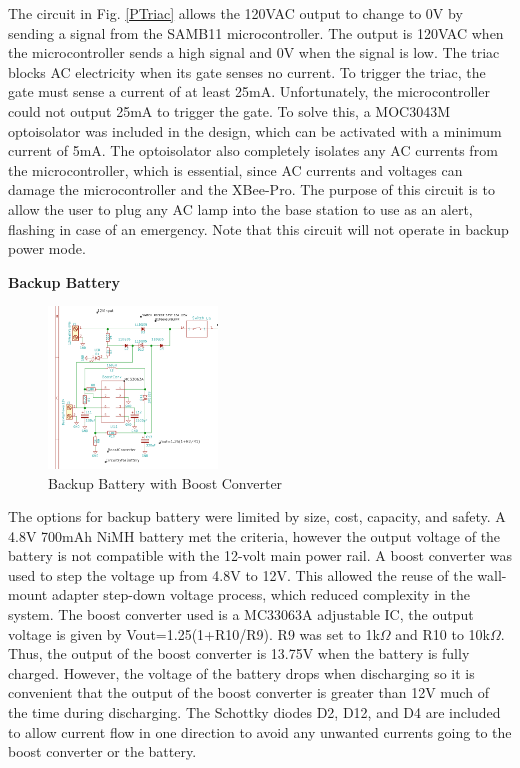 \documentclass[journal,compsoc]{IEEEtran}
\begin{document}
The circuit in Fig. \ref{PTriac} allows the 120VAC output to change to 0V by sending a signal from the SAMB11 microcontroller.  The output is 120VAC when the microcontroller sends a high signal and 0V when the signal is low.  The triac blocks AC electricity when its gate senses no current.  To trigger the triac, the gate must sense a current of at least 25mA.  Unfortunately, the microcontroller could not output 25mA to trigger the gate.  To solve this, a MOC3043M optoisolator was included in the design, which can be activated with a minimum current of 5mA.  The optoisolator also completely isolates any AC currents from the microcontroller, which is essential, since AC currents and voltages can damage the microcontroller and the XBee-Pro.  The purpose of this circuit is to allow the user to plug any AC lamp into the base station to use as an alert, flashing in case of an emergency.  Note that this circuit will not operate in backup power mode.


\textbf {Backup Battery}

\begin{figure}[ht]	%
\centering
\includegraphics[width=0.4\textwidth]{Boost.png}
\caption{Backup Battery with Boost Converter}
\label{Pboost}
\end{figure}

The options for backup battery were limited by size, cost, capacity, and safety.  A 4.8V 700mAh NiMH battery met the criteria, however the output voltage of the battery is not compatible with the 12-volt main power rail.  A boost converter was used to step the voltage up from 4.8V to 12V.  This allowed the reuse of the wall-mount adapter step-down voltage process, which reduced complexity in the system.  The boost converter used is a MC33063A adjustable IC, the output voltage is given by Vout=1.25(1+R10/R9).  R9 was set to 1k$\Omega$ and R10 to 10k$\Omega$.  Thus, the output of the boost converter is 13.75V when the battery is fully charged.  However, the voltage of the battery drops when discharging so it is convenient that the output of the boost converter is greater than 12V much of the time during discharging.  The Schottky diodes D2, D12, and D4 are included to allow current flow in one direction to avoid any unwanted currents going to the boost converter or the battery.
\end{document}
